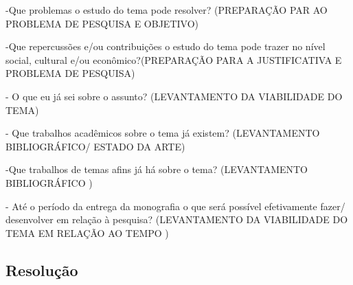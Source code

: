 -Que problemas o estudo do tema pode resolver? (PREPARAÇÃO PAR AO PROBLEMA DE PESQUISA E OBJETIVO)

-Que repercussões e/ou contribuições o estudo do tema pode trazer no nível social, cultural e/ou econômico?(PREPARAÇÃO PARA A JUSTIFICATIVA E PROBLEMA DE PESQUISA)

- O que eu já sei sobre o assunto? (LEVANTAMENTO DA VIABILIDADE DO TEMA)

- Que trabalhos acadêmicos  sobre o tema já existem? (LEVANTAMENTO BIBLIOGRÁFICO/ ESTADO DA ARTE)

-Que trabalhos de temas afins já há sobre o tema? (LEVANTAMENTO BIBLIOGRÁFICO )

- Até o período da entrega da monografia o que será possível efetivamente fazer/ desenvolver em relação à pesquisa? (LEVANTAMENTO DA VIABILIDADE DO TEMA EM RELAÇÃO AO TEMPO )

\subsection{Resolução}


